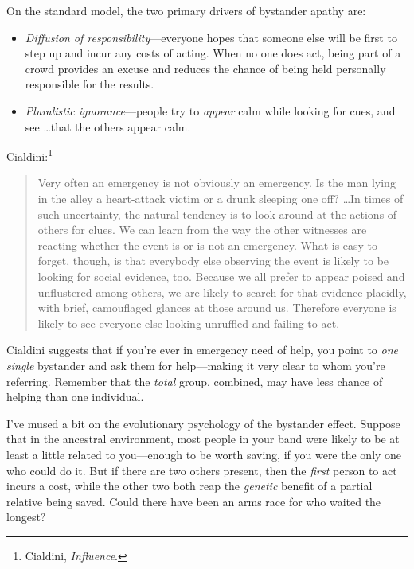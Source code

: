 {
 On the standard model, the two primary drivers of bystander apathy
are:}

\begin{itemize}
\item {
 \textit{Diffusion of responsibility}{}---everyone hopes that
someone else will be first to step up and incur any costs of acting.
When no one does act, being part of a crowd provides an excuse and
reduces the chance of being held personally responsible for the
results.}

\item {
 \textit{Pluralistic ignorance}{}---people try to \textit{appear}
calm while looking for cues, and see \ldots that the others appear
calm.}
\end{itemize}

{
 Cialdini:\footnote{Cialdini, \textit{Influence}.}}

\begin{quote}
{
 Very often an emergency is not obviously an emergency. Is the man
lying in the alley a heart-attack victim or a drunk sleeping one off?
\ldots In times of such uncertainty, the natural tendency is to look
around at the actions of others for clues. We can learn from the way
the other witnesses are reacting whether the event is or is not an
emergency. What is easy to forget, though, is that everybody else
observing the event is likely to be looking for social evidence, too.
Because we all prefer to appear poised and unflustered among others, we
are likely to search for that evidence placidly, with brief,
camouflaged glances at those around us. Therefore everyone is likely to
see everyone else looking unruffled and failing to act.}
\end{quote}

{
 Cialdini suggests that if you're ever in emergency
need of help, you point to \textit{one single} bystander and ask them
for help---making it very clear to whom you're
referring. Remember that the \textit{total} group, combined, may have
less chance of helping than one individual.}

{
 I've mused a bit on the evolutionary psychology of
the bystander effect. Suppose that in the ancestral environment, most
people in your band were likely to be at least a little related to
you---enough to be worth saving, if you were the only one who could do
it. But if there are two others present, then the \textit{first} person
to act incurs a cost, while the other two both reap the
\textit{genetic} benefit of a partial relative being saved. Could there
have been an arms race for who waited the longest?}

